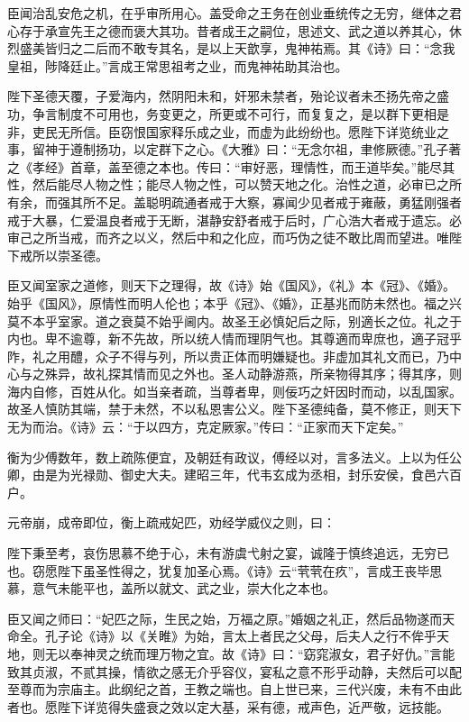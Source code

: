 \documentclass[]{article}
\begin{document}
臣闻治乱安危之机，在乎审所用心。盖受命之王务在创业垂统传之无穷，继体之君心存于承宣先王之德而褒大其功。昔者成王之嗣位，思述文、武之道以养其心，休烈盛美皆归之二后而不敢专其名，是以上天歆享，鬼神祐焉。其《诗》曰：``念我皇祖，陟降廷止。''言成王常思祖考之业，而鬼神祐助其治也。

陛下圣德天覆，子爱海内，然阴阳未和，奸邪未禁者，殆论议者未丕扬先帝之盛功，争言制度不可用也，务变更之，所更或不可行，而复复之，是以群下更相是非，吏民无所信。臣窃恨国家释乐成之业，而虚为此纷纷也。愿陛下详览统业之事，留神于遵制扬功，以定群下之心。《大雅》曰：``无念尔祖，聿修厥德。''孔子著之《孝经》首章，盖至德之本也。传曰：``审好恶，理情性，而王道毕矣。''能尽其性，然后能尽人物之性；能尽人物之性，可以赞天地之化。治性之道，必审已之所有余，而强其所不足。盖聪明疏通者戒于大察，寡闻少见者戒于雍蔽，勇猛刚强者戒于大暴，仁爱温良者戒于无断，湛静安舒者戒于后时，广心浩大者戒于遗忘。必审己之所当戒，而齐之以义，然后中和之化应，而巧伪之徒不敢比周而望进。唯陛下戒所以崇圣德。

臣又闻室家之道修，则天下之理得，故《诗》始《国风》，《礼》本《冠》、《婚》。始乎《国风》，原情性而明人伦也；本乎《冠》、《婚》，正基兆而防未然也。福之兴莫不本乎室家。道之衰莫不始乎阃内。故圣王必慎妃后之际，别適长之位。礼之于内也。卑不逾尊，新不先故，所以统人情而理阴气也。其尊適而卑庶也，適子冠乎阼，礼之用醴，众子不得与列，所以贵正体而明嫌疑也。非虚加其礼文而已，乃中心与之殊异，故礼探其情而见之外也。圣人动静游燕，所亲物得其序；得其序，则海内自修，百姓从化。如当亲者疏，当尊者卑，则佞巧之奸因时而动，以乱国家。故圣人慎防其端，禁于未然，不以私恩害公义。陛下圣德纯备，莫不修正，则天下无为而治。《诗》云：``于以四方，克定厥家。''传曰：``正家而天下定矣。''

衡为少傅数年，数上疏陈便宜，及朝廷有政议，傅经以对，言多法义。上以为任公卿，由是为光禄勋、御史大夫。建昭三年，代韦玄成为丞相，封乐安侯，食邑六百户。

元帝崩，成帝即位，衡上疏戒妃匹，劝经学威仪之则，曰：

陛下秉至考，哀伤思慕不绝于心，未有游虞弋射之宴，诚隆于慎终追远，无穷已也。窃愿陛下虽圣性得之，犹复加圣心焉。《诗》云``茕茕在疚''，言成王丧毕思慕，意气未能平也，盖所以就文、武之业，崇大化之本也。

臣又闻之师曰：``妃匹之际，生民之始，万福之原。''婚姻之礼正，然后品物遂而天命全。孔子论《诗》以《关睢》为始，言太上者民之父母，后夫人之行不侔乎天地，则无以奉神灵之统而理万物之宜。故《诗》曰：``窈窕淑女，君子好仇。''言能致其贞淑，不贰其操，情欲之感无介乎容仪，宴私之意不形乎动静，夫然后可以配至尊而为宗庙主。此纲纪之首，王教之端也。自上世已来，三代兴废，未有不由此者也。愿陛下详览得失盛衰之效以定大基，采有德，戒声色，近严敬，远技能。
\end{document}
